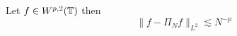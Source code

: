 \begin{theorem} \label{th:trig:convergence_L2}
  Let $f \in W^{p,2}(\mathbb{T})$ then
  \[
      \|f - \Pi_N f \|_{L^2} \lesssim N^{-p}
  \]  
\end{theorem}






